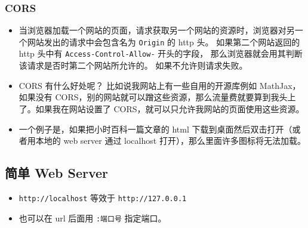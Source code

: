 \subsubsection{CORS}
\begin{itemize}
\item 当浏览器加载一个网站的页面，请求获取另一个网站的资源时，浏览器对另一个网站发出的请求中会包含名为 \verb`Origin` 的 http 头。 如果第二个网站返回的 http 头中有 \verb`Access-Control-Allow-` 开头的字段， 那么浏览器就会用其判断该请求是否时第二个网站所允许的。 如果不允许则请求失败。
\item CORS 有什么好处呢？ 比如说我网站上有一些自用的开源库例如 MathJax，如果没有 CORS，别的网站就可以蹭这些资源，那么流量费就要算到我头上了。如果我在网站设置了 CORS，就可以只允许我网站的页面使用这些资源。
\item 一个例子是，如果把小时百科一篇文章的 html 下载到桌面然后双击打开（或者用本地的 web server 通过 localhost 打开），那么里面许多图标将无法加载。
\end{itemize}

\subsection{简单 Web Server}
\begin{itemize}
\item \verb`http://localhost` 等效于 \verb`http://127.0.0.1`
\item 也可以在 url 后面用 \verb`:端口号` 指定端口。
\end{itemize}
